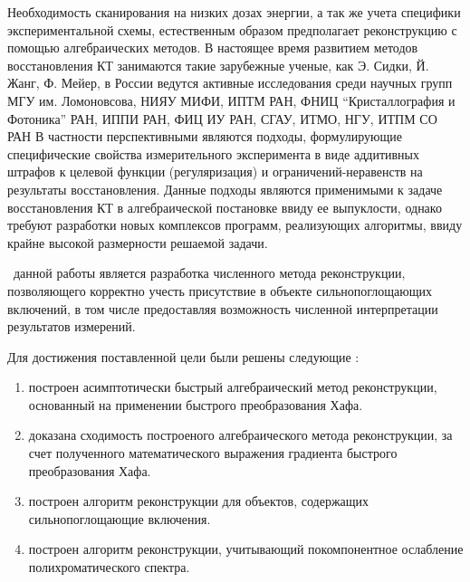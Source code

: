 Необходимость сканирования на низких дозах энергии, а так же учета специфики экспериментальной схемы, естественным образом предполагает реконструкцию с помощью алгебраических методов.
В настоящее время развитием методов восстановления КТ занимаются такие зарубежные ученые, как Э. Сидки, Й. Жанг, Ф. Мейер, в России ведутся активные исследования среди научных групп МГУ им. Ломоновсова, НИЯУ МИФИ, ИПТМ РАН, ФНИЦ ``Кристаллография и Фотоника'' РАН, ИППИ РАН, ФИЦ ИУ РАН, СГАУ, ИТМО, НГУ, ИТПМ СО РАН
В частности перспективными являются подходы, формулирующие специфические свойства измерительного эксперимента в виде аддитивных штрафов к целевой функции (регуляризация) и ограничений-неравенств на результаты восстановления.
Данные подходы являются применимыми к задаче восстановления КТ в алгебраической постановке ввиду ее выпуклости, однако требуют разработки новых комплексов программ, реализующих алгоритмы, ввиду крайне высокой размерности решаемой задачи.








{\aim} ~данной работы является разработка численного метода реконструкции, позволяющего корректно учесть присутствие в объекте сильнопоглощающих включений, в том числе предоставляя возможность численной интерпретации результатов измерений.

Для достижения поставленной цели были решены следующие {\tasks}:
\begin{enumerate}
  \item построен асимптотически быстрый алгебраический метод реконструкции, основанный на применении быстрого преобразования Хафа.
  \item доказана сходимость построеного алгебраического метода реконструкции, за счет полученного математического выражения градиента быстрого преобразования Хафа.
  \item построен алгоритм реконструкции для объектов, содержащих сильнопоглощающие включения.
  \item построен алгоритм реконструкции, учитывающий покомпонентное ослабление полихроматического спектра.
\end{enumerate}

